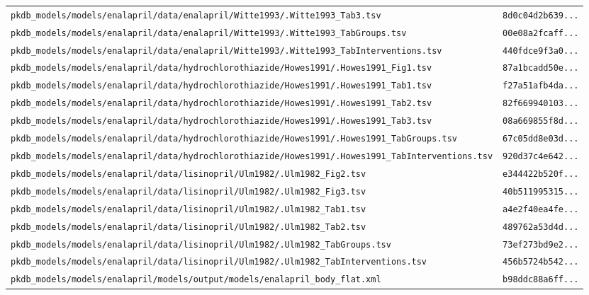 \documentclass{article}
\begin{document}
\begin{longtable}{ll}
\texttt{pkdb\_models/models/enalapril/data/enalapril/Witte1993/.Witte1993\_Tab3.tsv} & \texttt{8d0c04d2b639...} \\
\texttt{pkdb\_models/models/enalapril/data/enalapril/Witte1993/.Witte1993\_TabGroups.tsv} & \texttt{00e08a2fcaff...} \\
\texttt{pkdb\_models/models/enalapril/data/enalapril/Witte1993/.Witte1993\_TabInterventions.tsv} & \texttt{440fdce9f3a0...} \\
\texttt{pkdb\_models/models/enalapril/data/hydrochlorothiazide/Howes1991/.Howes1991\_Fig1.tsv} & \texttt{87a1bcadd50e...} \\
\texttt{pkdb\_models/models/enalapril/data/hydrochlorothiazide/Howes1991/.Howes1991\_Tab1.tsv} & \texttt{f27a51afb4da...} \\
\texttt{pkdb\_models/models/enalapril/data/hydrochlorothiazide/Howes1991/.Howes1991\_Tab2.tsv} & \texttt{82f669940103...} \\
\texttt{pkdb\_models/models/enalapril/data/hydrochlorothiazide/Howes1991/.Howes1991\_Tab3.tsv} & \texttt{08a669855f8d...} \\
\texttt{pkdb\_models/models/enalapril/data/hydrochlorothiazide/Howes1991/.Howes1991\_TabGroups.tsv} & \texttt{67c05dd8e03d...} \\
\texttt{pkdb\_models/models/enalapril/data/hydrochlorothiazide/Howes1991/.Howes1991\_TabInterventions.tsv} & \texttt{920d37c4e642...} \\
\texttt{pkdb\_models/models/enalapril/data/lisinopril/Ulm1982/.Ulm1982\_Fig2.tsv} & \texttt{e344422b520f...} \\
\texttt{pkdb\_models/models/enalapril/data/lisinopril/Ulm1982/.Ulm1982\_Fig3.tsv} & \texttt{40b511995315...} \\
\texttt{pkdb\_models/models/enalapril/data/lisinopril/Ulm1982/.Ulm1982\_Tab1.tsv} & \texttt{a4e2f40ea4fe...} \\
\texttt{pkdb\_models/models/enalapril/data/lisinopril/Ulm1982/.Ulm1982\_Tab2.tsv} & \texttt{489762a53d4d...} \\
\texttt{pkdb\_models/models/enalapril/data/lisinopril/Ulm1982/.Ulm1982\_TabGroups.tsv} & \texttt{73ef273bd9e2...} \\
\texttt{pkdb\_models/models/enalapril/data/lisinopril/Ulm1982/.Ulm1982\_TabInterventions.tsv} & \texttt{456b5724b542...} \\
\texttt{pkdb\_models/models/enalapril/models/output/models/enalapril\_body\_flat.xml} & \texttt{b98ddc88a6ff...} \\
\end{longtable}
\end{document}
